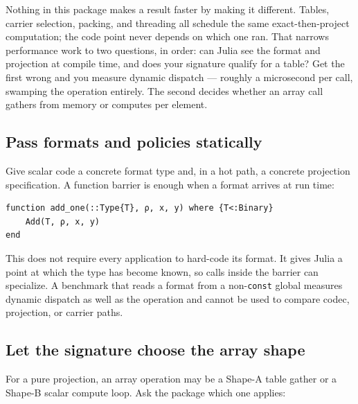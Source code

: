 \label{11678570700420481952}{}


Nothing in this package makes a result faster by making it different. Tables, carrier selection, packing, and threading all schedule the same exact-then-project computation; the code point never depends on which one ran. That narrows performance work to two questions, in order: can Julia see the format and projection at compile time, and does your signature qualify for a table? Get the first wrong and you measure dynamic dispatch — roughly a microsecond per call, swamping the operation entirely. The second decides whether an array call gathers from memory or computes per element.



\subsection{Pass formats and policies statically}



\label{1015688480124752373}{}


Give scalar code a concrete format type and, in a hot path, a concrete projection specification. A function barrier is enough when a format arrives at run time:




\nopagebreak[4]
\begin{verbatim}
function add_one(::Type{T}, ρ, x, y) where {T<:Binary}
    Add(T, ρ, x, y)
end
\end{verbatim}



This does not require every application to hard-code its format. It gives Julia a point at which the type has become known, so calls inside the barrier can specialize. A benchmark that reads a format from a non-\texttt{const} global measures dynamic dispatch as well as the operation and cannot be used to compare codec, projection, or carrier paths.



\subsection{Let the signature choose the array shape}



\label{16789507238512487416}{}


For a pure projection, an array operation may be a Shape-A table gather or a Shape-B scalar compute loop. Ask the package which one applies:




